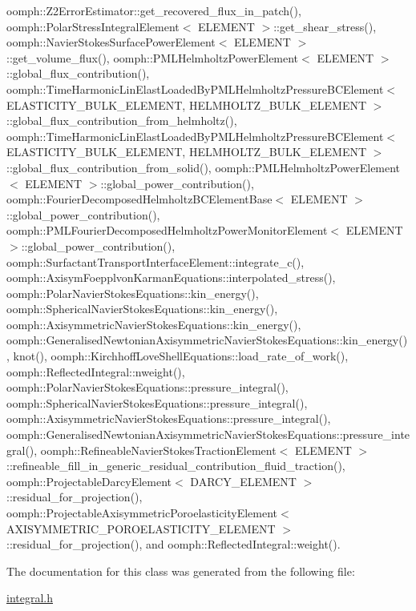 oomph\+::\+Z2\+Error\+Estimator\+::get\+\_\+recovered\+\_\+flux\+\_\+in\+\_\+patch(), oomph\+::\+Polar\+Stress\+Integral\+Element$<$ E\+L\+E\+M\+E\+N\+T $>$\+::get\+\_\+shear\+\_\+stress(), oomph\+::\+Navier\+Stokes\+Surface\+Power\+Element$<$ E\+L\+E\+M\+E\+N\+T $>$\+::get\+\_\+volume\+\_\+flux(), oomph\+::\+P\+M\+L\+Helmholtz\+Power\+Element$<$ E\+L\+E\+M\+E\+N\+T $>$\+::global\+\_\+flux\+\_\+contribution(), oomph\+::\+Time\+Harmonic\+Lin\+Elast\+Loaded\+By\+P\+M\+L\+Helmholtz\+Pressure\+B\+C\+Element$<$ E\+L\+A\+S\+T\+I\+C\+I\+T\+Y\+\_\+\+B\+U\+L\+K\+\_\+\+E\+L\+E\+M\+E\+N\+T, H\+E\+L\+M\+H\+O\+L\+T\+Z\+\_\+\+B\+U\+L\+K\+\_\+\+E\+L\+E\+M\+E\+N\+T $>$\+::global\+\_\+flux\+\_\+contribution\+\_\+from\+\_\+helmholtz(), oomph\+::\+Time\+Harmonic\+Lin\+Elast\+Loaded\+By\+P\+M\+L\+Helmholtz\+Pressure\+B\+C\+Element$<$ E\+L\+A\+S\+T\+I\+C\+I\+T\+Y\+\_\+\+B\+U\+L\+K\+\_\+\+E\+L\+E\+M\+E\+N\+T, H\+E\+L\+M\+H\+O\+L\+T\+Z\+\_\+\+B\+U\+L\+K\+\_\+\+E\+L\+E\+M\+E\+N\+T $>$\+::global\+\_\+flux\+\_\+contribution\+\_\+from\+\_\+solid(), oomph\+::\+P\+M\+L\+Helmholtz\+Power\+Element$<$ E\+L\+E\+M\+E\+N\+T $>$\+::global\+\_\+power\+\_\+contribution(), oomph\+::\+Fourier\+Decomposed\+Helmholtz\+B\+C\+Element\+Base$<$ E\+L\+E\+M\+E\+N\+T $>$\+::global\+\_\+power\+\_\+contribution(), oomph\+::\+P\+M\+L\+Fourier\+Decomposed\+Helmholtz\+Power\+Monitor\+Element$<$ E\+L\+E\+M\+E\+N\+T $>$\+::global\+\_\+power\+\_\+contribution(), oomph\+::\+Surfactant\+Transport\+Interface\+Element\+::integrate\+\_\+c(), oomph\+::\+Axisym\+Foepplvon\+Karman\+Equations\+::interpolated\+\_\+stress(), oomph\+::\+Polar\+Navier\+Stokes\+Equations\+::kin\+\_\+energy(), oomph\+::\+Spherical\+Navier\+Stokes\+Equations\+::kin\+\_\+energy(), oomph\+::\+Axisymmetric\+Navier\+Stokes\+Equations\+::kin\+\_\+energy(), oomph\+::\+Generalised\+Newtonian\+Axisymmetric\+Navier\+Stokes\+Equations\+::kin\+\_\+energy(), knot(), oomph\+::\+Kirchhoff\+Love\+Shell\+Equations\+::load\+\_\+rate\+\_\+of\+\_\+work(), oomph\+::\+Reflected\+Integral\+::nweight(), oomph\+::\+Polar\+Navier\+Stokes\+Equations\+::pressure\+\_\+integral(), oomph\+::\+Spherical\+Navier\+Stokes\+Equations\+::pressure\+\_\+integral(), oomph\+::\+Axisymmetric\+Navier\+Stokes\+Equations\+::pressure\+\_\+integral(), oomph\+::\+Generalised\+Newtonian\+Axisymmetric\+Navier\+Stokes\+Equations\+::pressure\+\_\+integral(), oomph\+::\+Refineable\+Navier\+Stokes\+Traction\+Element$<$ E\+L\+E\+M\+E\+N\+T $>$\+::refineable\+\_\+fill\+\_\+in\+\_\+generic\+\_\+residual\+\_\+contribution\+\_\+fluid\+\_\+traction(), oomph\+::\+Projectable\+Darcy\+Element$<$ D\+A\+R\+C\+Y\+\_\+\+E\+L\+E\+M\+E\+N\+T $>$\+::residual\+\_\+for\+\_\+projection(), oomph\+::\+Projectable\+Axisymmetric\+Poroelasticity\+Element$<$ A\+X\+I\+S\+Y\+M\+M\+E\+T\+R\+I\+C\+\_\+\+P\+O\+R\+O\+E\+L\+A\+S\+T\+I\+C\+I\+T\+Y\+\_\+\+E\+L\+E\+M\+E\+N\+T $>$\+::residual\+\_\+for\+\_\+projection(), and oomph\+::\+Reflected\+Integral\+::weight().



The documentation for this class was generated from the following file\+:\begin{DoxyCompactItemize}
\item 
\hyperlink{integral_8h}{integral.\+h}\end{DoxyCompactItemize}
